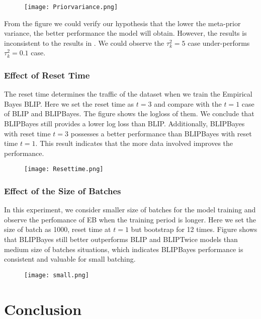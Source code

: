 \documentclass{article}
\begin{document}
\begin{figure}
  \centering
  \texttt{[image: Priorvariance.png]}
\end{figure}

From the figure we could verify our hypothesis that the lower the meta-prior variance, the better performance the model will obtain. However, the results is inconsistent to the results in \cite{BEB}. We could observe the $\tau_k^2 = 5$ case under-performs $\tau_k^2 = 0.1$ case.

\subsubsection{Effect of Reset Time}

The reset time determines the traffic of the dataset when we train the Empirical Bayes BLIP. Here we set the reset time as $t=3$ and compare with the $t=1$ case of BLIP and BLIPBayes. The figure shows the logloss of them. We conclude that BLIPBayes still provides a lower log loss than BLIP. Additionally, BLIPBayes with reset time $t=3$ possesses a better performance than BLIPBayes with reset time $t=1$. This result indicates that the more data involved improves the performance.

\begin{figure}
  \centering
  \texttt{[image: Resettime.png]}
\end{figure}

\subsubsection{Effect of the Size of Batches}

In this experiment, we consider smaller size of batches for the model training and observe the perfomance of EB when the training period is longer. Here we set the size of batch as 1000, reset time at $t=1$ but bootstrap for 12 times. Figure shows that BLIPBayes still better outperforms BLIP and BLIPTwice models than medium size of batches situations, which indicates BLIPBayes performance is consistent and valuable for small batching.

\begin{figure}
  \centering
  \texttt{[image: small.png]}
\end{figure}

\section{Conclusion}
\end{document}
